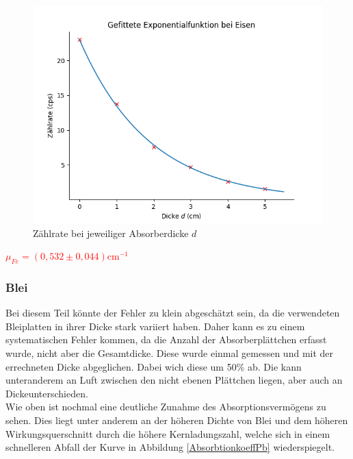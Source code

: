 \begin{figure}[ht]
    \centering
    \includegraphics[width = 12cm]{Bilder/Auswertung/AbsorbtioskFe.png}
    \caption{Zählrate bei jeweiliger Absorberdicke $d$}
    \label{AbsorbtionkoeffFe}
\end{figure}

\begin{center}
    \centering
    \textcolor{red}{$\mu_{Fe}= (0,532 \pm 0,044) \mathrm{cm}^{-1}$}
\end{center}

\subsubsection*{Blei}

Bei diesem Teil könnte der Fehler zu klein abgeschätzt sein, da die verwendeten Bleiplatten in ihrer Dicke stark variiert haben. Daher kann es zu einem 
systematischen Fehler kommen, da die Anzahl der Absorberplättchen erfasst wurde, nicht aber die Gesamtdicke. Diese wurde einmal gemessen und mit der 
errechneten Dicke abgeglichen. Dabei wich diese um 50\% ab. Die kann unteranderem an Luft zwischen den nicht ebenen Plättchen liegen, aber auch an Dickeunterschieden.\\
Wie oben ist nochmal eine deutliche Zunahme des Absorptionsvermögens zu sehen. Dies liegt unter anderem an der höheren Dichte von Blei und dem höheren 
Wirkungsquerschnitt durch die höhere Kernladungszahl, welche sich in einem schnelleren Abfall der Kurve in Abbildung \ref{AbsorbtionkoeffPb} wiederspiegelt.

